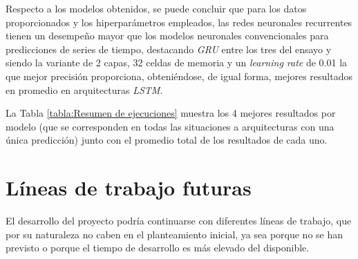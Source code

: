 Respecto a los modelos obtenidos, se puede concluir que para los datos proporcionados y los hiperparámetros
empleados, las redes neuronales recurrentes tienen un desempeño mayor que los modelos neuronales
convencionales para predicciones de series de tiempo, destacando \textit{GRU}
entre los tres del ensayo y siendo la variante de 2 capas, 32 celdas de memoria y un \textit{learning rate}
de 0.01 la que mejor precisión proporciona, obteniéndose, de igual forma, mejores resultados en 
promedio en arquitecturas \textit{LSTM}.

La Tabla \ref{tabla:Resumen de ejecuciones} muestra los 4 mejores resultados por modelo (que se 
corresponden en todas las situaciones a arquitecturas con una única predicción) junto con el 
promedio total de los resultados de cada uno.

\section{Líneas de trabajo futuras}
El desarrollo del proyecto podría continuarse con diferentes líneas de trabajo, que por su naturaleza
no caben en el planteamiento inicial, ya sea porque no se han previsto o porque el tiempo
de desarrollo es más elevado del disponible.

